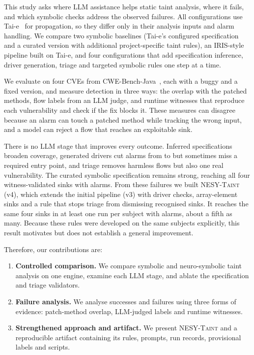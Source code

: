 \documentclass[sigconf]{acmart}
\newcommand{\tool}{\textsc{NESY-Taint}}
\begin{document}
This study asks where LLM assistance helps static taint analysis, where it fails, and which symbolic checks address the observed failures. All configurations use Tai-e~\cite{tan2023taie} for propagation, so they differ only in their analysis inputs and alarm handling. We compare two symbolic baselines (Tai-e's configured specification and a curated version with additional project-specific taint rules), an IRIS-style pipeline built on Tai-e, and four configurations that add specification inference, driver generation, triage and targeted symbolic rules one step at a time.

We evaluate on four CVEs from CWE-Bench-Java~\cite{li2025iris}, each with a buggy and a fixed version, and measure detection in three ways: the overlap with the patched methods, flow labels from an LLM judge, and runtime witnesses that reproduce each vulnerability and check if the fix blocks it. These measures can disagree because an alarm can touch a patched method while tracking the wrong input, and a model can reject a flow that reaches an exploitable sink.

There is no LLM stage that improves every outcome. Inferred specifications broaden coverage, generated drivers cut alarms from \VOneAlarms{} to \VTwoAlarms{} but sometimes miss a required entry point, and triage removes harmless flows but also one real vulnerability. The curated symbolic specification remains strong, reaching all four witness-validated sinks with \BTwoAlarms{} alarms. From these failures we built \tool{} (v4), which extends the initial pipeline (v3) with driver checks, array-element sinks and a rule that stops triage from dismissing recognised sinks. It reaches the same four sinks in at least one run per subject with \VFourAlarms{} alarms, about a fifth as many. Because these rules were developed on the same subjects explicitly, this result motivates but does not establish a general improvement.

Therefore, our contributions are:

\begin{enumerate}
    \item \textbf{Controlled comparison.}
    We compare symbolic and neuro-symbolic taint analysis
    on one engine, examine each LLM stage, and ablate
    the specification and triage validators.

    \item \textbf{Failure analysis.}
    We analyse successes and failures using three forms
    of evidence: patch-method overlap, LLM-judged labels
    and runtime witnesses.

    \item \textbf{Strengthened approach and artifact.}
    We present \tool{} and a reproducible artifact containing
    its rules, prompts, run records, provisional labels
    and scripts.
\end{enumerate}
\end{document}
